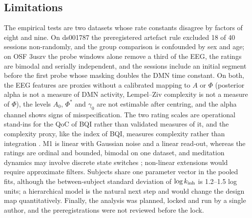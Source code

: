 \subsection{Limitations}
\label{sec:limitations}
The empirical tests are two datasets whose rate constants disagree by factors of eight and nine. On ds001787 the preregistered artefact rule excluded 18 of 40 sessions non-randomly, and the group comparison is confounded by sex and age; on OSF 3uszv the probe windows alone remove a third of the EEG, the ratings are bimodal and serially independent, and the sessions include an initial segment before the first probe whose masking doubles the DMN time constant. On both, the EEG features are proxies without a calibrated mapping to $A$ or $\Phi$ (posterior alpha is not a measure of DMN activity, Lempel--Ziv complexity is not a measure of $\Phi$), the levels $A_0$, $\Phi^*$ and $\gamma_0$ are not estimable after centring, and the alpha channel shows signs of misspecification. The two rating scales are operational stand-ins for the QoC of BQI rather than validated measures of it, and the complexity proxy, like the index of BQI, measures complexity rather than integration \cite[Sec.~11.3]{BQI}. M1 is linear with Gaussian noise and a linear read-out, whereas the ratings are ordinal and bounded, bimodal on one dataset, and meditation dynamics may involve discrete state switches \cite{Hasenkamp2012,Christoff2016}; non-linear extensions would require approximate filters. Subjects share one parameter vector in the pooled fits, although the between-subject standard deviation of $\log k_{\mathrm{inh}}$ is 1.2--1.5 log units; a hierarchical model is the natural next step and would change the design map quantitatively. Finally, the analysis was planned, locked and run by a single author, and the preregistrations were not reviewed before the lock.
